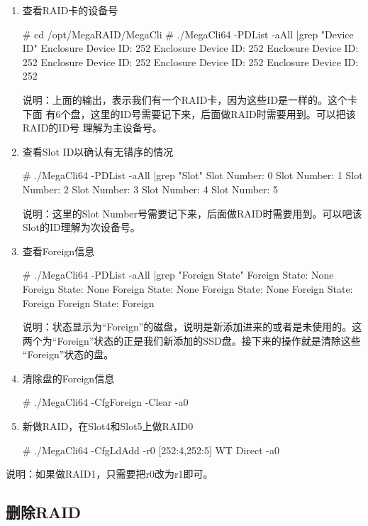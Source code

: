 \begin{enumerate}[itemsep=0pt,parsep=0pt]
\item 查看RAID卡的设备号
\begin{code}
# cd /opt/MegaRAID/MegaCli
# ./MegaCli64 -PDList -aAll |grep "Device ID"
Enclosure Device ID: 252
Enclosure Device ID: 252 
Enclosure Device ID: 252
Enclosure Device ID: 252
Enclosure Device ID: 252
Enclosure Device ID: 252
\end{code}

说明：上面的输出，表示我们有一个RAID卡，因为这些ID是一样的。这个卡下面
有6个盘，这里的ID号需要记下来，后面做RAID时需要用到。可以把该RAID的ID号
理解为主设备号。
	
\item 查看Slot ID以确认有无错序的情况
\begin{code}
# ./MegaCli64 -PDList -aAll |grep "Slot"  
Slot Number: 0
Slot Number: 1
Slot Number: 2
Slot Number: 3
Slot Number: 4
Slot Number: 5
\end{code}

说明：这里的Slot Number号需要记下来，后面做RAID时需要用到。可以吧该
Slot的ID理解为次设备号。
	
\item 查看Foreign信息
\begin{code}
# ./MegaCli64 -PDList -aAll |grep "Foreign State"
Foreign State: None
Foreign State: None 
Foreign State: None
Foreign State: None
Foreign State: Foreign 
Foreign State: Foreign 
\end{code}

说明：状态显示为“Foreign”的磁盘，说明是新添加进来的或者是未使用的。这
两个为“Foreign”状态的正是我们新添加的SSD盘。接下来的操作就是清除这些
“Foreign”状态的盘。
	
\item 清除盘的Foreign信息
\begin{code}
# ./MegaCli64 -CfgForeign -Clear -a0
\end{code}
	
\item 新做RAID，在Slot4和Slot5上做RAID0
\begin{code}
# ./MegaCli64 -CfgLdAdd -r0 [252:4,252:5] WT Direct -a0
\end{code}
\end{enumerate}

说明：如果做RAID1，只需要把r0改为r1即可。

\subsection{删除RAID}

